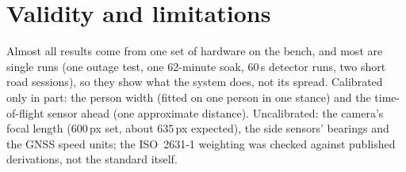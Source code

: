 \section{Validity and limitations}
\label{sec:disc-validity}

Almost all results come from one set of hardware on the bench, and most are single runs (one outage test, one 62-minute soak, 60\,s detector runs, two short road sessions), so they show what the system does, not its spread. Calibrated only in part: the person width (fitted on one person in one stance) and the time-of-flight sensor ahead (one approximate distance). Uncalibrated: the camera's focal length (600\,px set, about 635\,px expected), the side sensors' bearings and the GNSS speed units; the ISO~2631-1 weighting was checked against published derivations, not the standard itself.
